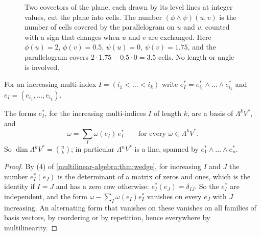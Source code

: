 \begin{notechapter}
\begin{figure}[ht]
\centering
{}
\caption{Two covectors of the plane, each drawn by its level lines at
integer values, cut the plane into cells. The number
$(\phi\wedge\psi)(u, v)$ is the number of cells covered by the
parallelogram on $u$ and $v$, counted with a sign that changes when $u$
and $v$ are exchanged. Here $\phi(u) = 2$, $\phi(v) = 0.5$,
$\psi(u) = 0$, $\psi(v) = 1.75$, and the parallelogram covers
$2\cdot1.75 - 0.5\cdot0 = 3.5$ cells. No length or angle is involved.}
\label{multilinear-algebra:fig:cells}
\end{figure}

For an increasing multi-index $I = (i_1 < \dots < i_k)$ write
$e_I^* = e_{i_1}^*\wedge\dots\wedge e_{i_k}^*$ and
$e_I = (e_{i_1},\dots,e_{i_k})$.

\begin{theorem}\label{multilinear-algebra:thm:basis}
The forms $e_I^*$, for the increasing multi-indices $I$ of length $k$,
are a basis of $\Lambda^kV^*$, and
\[
  \omega = \sum_I\omega(e_I)\,e_I^*\qquad\text{for every }
  \omega\in\Lambda^kV^* .
\]
So $\dim\Lambda^kV^* = \binom nk$; in particular $\Lambda^nV^*$ is a
line, spanned by $e_1^*\wedge\dots\wedge e_n^*$.
\end{theorem}

\begin{proof}
By (4) of \cref{multilinear-algebra:thm:wedge}, for increasing $I$ and
$J$ the number $e_I^*(e_J)$ is the determinant of a matrix of zeros and
ones, which is the identity if $I = J$ and has a zero row otherwise:
$e_I^*(e_J) = \delta_{IJ}$. So the $e_I^*$ are independent, and the
form $\omega - \sum_I\omega(e_I)e_I^*$ vanishes on every $e_J$ with $J$
increasing. An alternating form that vanishes on these vanishes on all
families of basis vectors, by reordering or by repetition, hence
everywhere by multilinearity.
\end{proof}


\end{notechapter}
